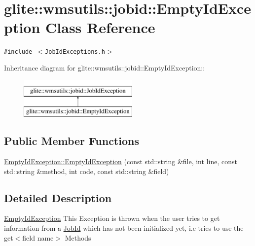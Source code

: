 \hypertarget{classglite_1_1wmsutils_1_1jobid_1_1EmptyIdException}{
\section{glite::wmsutils::jobid::Empty\-Id\-Exception Class Reference}
\label{classglite_1_1wmsutils_1_1jobid_1_1EmptyIdException}
}
{\tt \#include $<$Job\-Id\-Exceptions.h$>$}

Inheritance diagram for glite::wmsutils::jobid::Empty\-Id\-Exception::\begin{figure}[H]
\begin{center}
\leavevmode
\includegraphics[height=2cm]{classglite_1_1wmsutils_1_1jobid_1_1EmptyIdException}
\end{center}
\end{figure}
\subsection*{Public Member Functions}
\begin{CompactItemize}
\item 
\hyperlink{classglite_1_1wmsutils_1_1jobid_1_1EmptyIdException_a0}{Empty\-Id\-Exception::Empty\-Id\-Exception} (const std::string \&file, int line, const std::string \&method, int code, const std::string \&field)
\end{CompactItemize}


\subsection{Detailed Description}
\hyperlink{classglite_1_1wmsutils_1_1jobid_1_1EmptyIdException}{Empty\-Id\-Exception} This Exception is thrown when the user tries to get information from a \hyperlink{classglite_1_1wmsutils_1_1jobid_1_1JobId}{Job\-Id} which has not been initialized yet, i.e tries to use the get$<$field name$>$ Methods 



